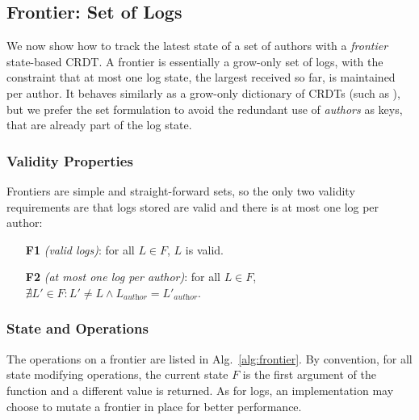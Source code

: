 \documentclass[9pt, oneside]{article}   	%
\begin{document}
\subsection{Frontier: Set of Logs}
\label{sec:design:frontier}

We now show how to track the latest state of a set of authors with a \textit{frontier} state-based CRDT. A frontier is essentially a grow-only set of logs, with the constraint that at most one log state, the largest received so far, is maintained per author. It behaves similarly as a grow-only dictionary of CRDTs (such as \cite{lavoie2023inftypset, lavoie2023gocledger}), but we prefer the set formulation to avoid the redundant use of \textit{authors} as keys, that are already part of the log state.

\subsubsection{Validity Properties}

Frontiers are simple and straight-forward sets, so the only two validity requirements are that logs stored are valid and there is at most one log per author:
\begin{tcolorbox}
\begin{enumerate}
	\item[\textbf{F1}] \textit{(valid logs)}: for all $L \in F$, $L$ is valid.
	\item[\textbf{F2}] \textit{(at most one log per author)}: for all $L \in F$, $\nexists L' \in F : L' \neq L \wedge L_\textit{author} = L'_\textit{author}$.
\end{enumerate}
\end{tcolorbox}


\subsubsection{State and Operations}

The operations on a frontier are listed in Alg.~\ref{alg:frontier}. By convention, for all state modifying operations, the current state $F$ is the first argument of the function and a different value is returned. As for logs, an implementation may choose to mutate a frontier in place for better performance.
\end{document}
